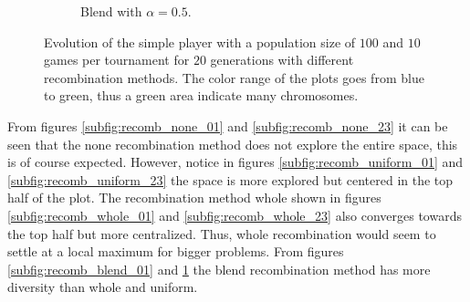 \documentclass{llncs}
\begin{document}
\begin{figure}[t]
\begin{subfigure}[t]{0.24\textwidth}
        \caption{Blend with $\alpha=0.5$.}
        \label{subfig:recomb_blend_23}
    \end{subfigure}
    \caption{Evolution of the simple player with a population size of $100$ and $10$ games per tournament for $20$ generations with different recombination methods. The color range of the plots goes from blue to green, thus a green area indicate many chromosomes.}
    \label{fig:recombination_method_simple}
\end{figure}
From figures \ref{subfig:recomb_none_01} and \ref{subfig:recomb_none_23} it can be seen that the none recombination method does not explore the entire space, this is of course expected. However, notice in figures \ref{subfig:recomb_uniform_01} and \ref{subfig:recomb_uniform_23} the space is more explored but centered in the top half of the plot. The recombination method whole shown in figures \ref{subfig:recomb_whole_01} and \ref{subfig:recomb_whole_23} also converges towards the top half but more centralized. Thus, whole recombination would seem to settle at a local maximum for bigger problems. From figures \ref{subfig:recomb_blend_01} and \ref{subfig:recomb_blend_23} the blend recombination method has more diversity than whole and uniform.
\end{document}
